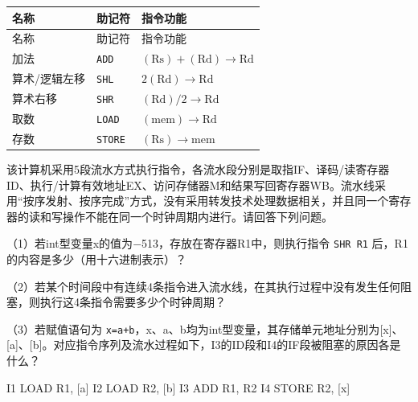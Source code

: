 \par\smallskip
{\fontsize{9.3}{12}\selectfont\setlength{\tabcolsep}{2.5pt}\setlength{\LTleft}{0pt}\setlength{\LTright}{0pt}
\begin{longtable}{@{}>{\raggedright\arraybackslash}p{}>{\raggedright\arraybackslash}p{}>{\raggedright\arraybackslash}p{}@{}}
\toprule
名称 & 助记符 & 指令功能 \\

\midrule\endfirsthead\toprule
名称 & 助记符 & 指令功能 \\

\midrule\endhead\bottomrule\endfoot
加法 & \texttt{ADD} & \((\mathrm{Rs})+(\mathrm{Rd})\to\mathrm{Rd}\) \\

算术/逻辑左移 & \texttt{SHL} & \(2(\mathrm{Rd})\to\mathrm{Rd}\) \\

算术右移 & \texttt{SHR} & \((\mathrm{Rd})/2\to\mathrm{Rd}\) \\

取数 & \texttt{LOAD} & \((\mathrm{mem})\to\mathrm{Rd}\) \\

存数 & \texttt{STORE} & \((\mathrm{Rs})\to\mathrm{mem}\) \\

\end{longtable}}
\par\smallskip

该计算机采用5段流水方式执行指令，各流水段分别是取指IF、译码/读寄存器ID、执行/计算有效地址EX、访问存储器M和结果写回寄存器WB。流水线采用``按序发射、按序完成''方式，没有采用转发技术处理数据相关，并且同一个寄存器的读和写操作不能在同一个时钟周期内进行。请回答下列问题。

（1）若int型变量x的值为\ensuremath{-}513，存放在寄存器R1中，则执行指令 \texttt{SHR R1} 后，R1的内容是多少（用十六进制表示）？

（2）若某个时间段中有连续4条指令进入流水线，在其执行过程中没有发生任何阻塞，则执行这4条指令需要多少个时钟周期？

（3）若赋值语句为 \texttt{x=\allowbreak{}a+\allowbreak{}b}，x、a、b均为int型变量，其存储单元地址分别为{[}x{]}、{[}a{]}、{[}b{]}。对应指令序列及流水过程如下，I3的ID段和I4的IF段被阻塞的原因各是什么？

\par\smallskip\noindent\begin{minipage}{\linewidth}
\begin{codeblock}[language={}]
I1  LOAD  R1, [a]
I2  LOAD  R2, [b]
I3  ADD   R1, R2
I4  STORE R2, [x]
\end{codeblock}
\end{minipage}\par\smallskip

